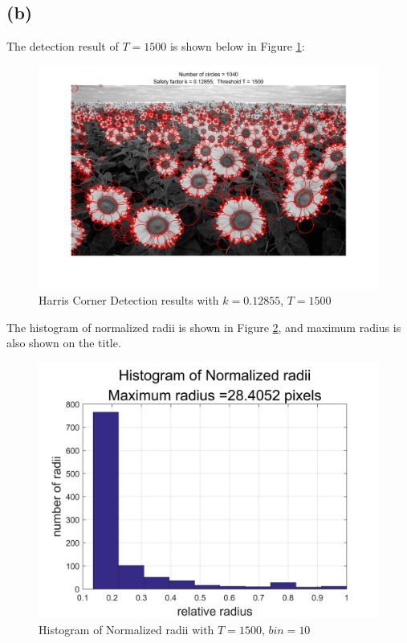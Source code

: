 \documentclass[letterpaper]{article}
\begin{document}
\subsection*{(b)}
The detection result of $T = 1500$ is shown below in Figure \ref{HW4_q2_c_k_012855}:\\
\begin{figure}[H]
\begin{center}
\includegraphics[width = 12cm]{HW4_q2_c_k_012855.jpeg}
\end{center}
\caption{Harris Corner Detection results with $k=0.12855$, $T = 1500$}
\label{HW4_q2_c_k_012855}
\end{figure}

The histogram of normalized radii is shown in Figure \ref{HW4_q2_c_hist}, and maximum radius is also shown on the title.\\
\begin{figure}[H]
\begin{center}
\includegraphics[width = 12cm]{HW4_q2_c_hist.jpeg}
\end{center}
\caption{Histogram of Normalized radii with $T = 1500$, $bin = 10$}
\label{HW4_q2_c_hist}
\end{figure}
\end{document}
